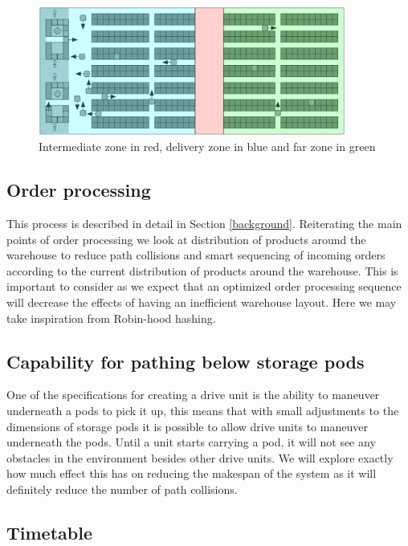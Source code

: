 \documentclass[a4paper,11pt]{article}
\begin{document}
\begin{figure}[h]
	\centering
	\includegraphics[width=0.9\textwidth]{graphics/kivasystemlayout_adjusted}
	\caption{Intermediate zone in red, delivery zone in blue and far zone in green}
	\label{kivalayout2}
\end{figure}

\subsection{Order processing}
\label{orderprocessing}
This process is described in detail in Section \ref{background}. Reiterating the main points of order processing we look at distribution of products around the warehouse to reduce path collisions and smart sequencing of incoming orders according to the current distribution of products around the warehouse. This is important to consider as we expect that an optimized order processing sequence will decrease the effects of having an inefficient warehouse layout. Here we may take inspiration from Robin-hood hashing.

\subsection{Capability for pathing below storage pods}
\label{beneathpods}
One of the specifications for creating a drive unit is the ability to maneuver underneath a pods to pick it up, this means that with small adjustments to the dimensions of storage pods it is possible to allow drive units to maneuver underneath the pods. Until a unit starts carrying a pod, it will not see any obstacles in the environment besides other drive units. We will explore exactly how much effect this has on reducing the makespan of the system as it will definitely reduce the number of path collisions.

\subsection{Timetable}
\end{document}
